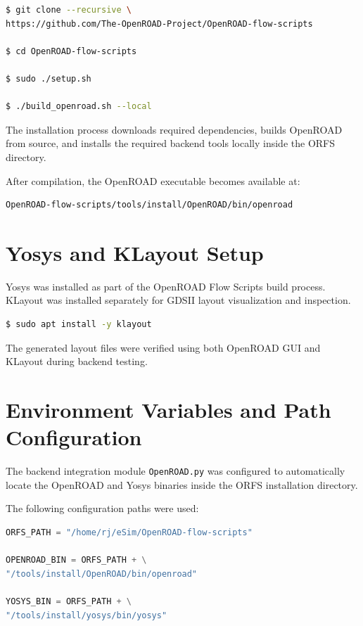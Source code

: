 \begin{lstlisting}[language=bash, caption={OpenROAD Flow Scripts installation commands.}]
$ git clone --recursive \
https://github.com/The-OpenROAD-Project/OpenROAD-flow-scripts

$ cd OpenROAD-flow-scripts

$ sudo ./setup.sh

$ ./build_openroad.sh --local
\end{lstlisting}

The installation process downloads required dependencies, builds OpenROAD from source, and installs the required backend tools locally inside the ORFS directory.

After compilation, the OpenROAD executable becomes available at:

\begin{lstlisting}[language=bash]
OpenROAD-flow-scripts/tools/install/OpenROAD/bin/openroad
\end{lstlisting}

\section{Yosys and KLayout Setup}

Yosys was installed as part of the OpenROAD Flow Scripts build process. KLayout was installed separately for GDSII layout visualization and inspection.

\begin{lstlisting}[language=bash, caption={KLayout installation command.}]
$ sudo apt install -y klayout
\end{lstlisting}

The generated layout files were verified using both OpenROAD GUI and KLayout during backend testing.

\section{Environment Variables and Path Configuration}

The backend integration module \texttt{OpenROAD.py} was configured to automatically locate the OpenROAD and Yosys binaries inside the ORFS installation directory.

The following configuration paths were used:

\begin{lstlisting}[language=python, caption={Tool path configuration inside OpenROAD.py.}]
ORFS_PATH = "/home/rj/eSim/OpenROAD-flow-scripts"

OPENROAD_BIN = ORFS_PATH + \
"/tools/install/OpenROAD/bin/openroad"

YOSYS_BIN = ORFS_PATH + \
"/tools/install/yosys/bin/yosys"
\end{lstlisting}

